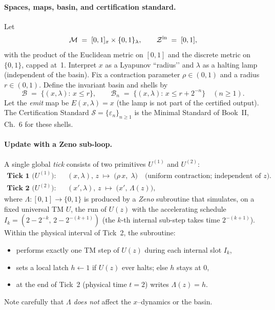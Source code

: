 \documentclass[12pt]{article}
\theoremstyle{definition}
\theoremstyle{plain}
\begin{document}
\paragraph{Spaces, maps, basin, and certification standard.}
Let
\[
\mathcal M \;=\; [0,1]_x \times \{0,1\}_\lambda,
\qquad
\mathcal Z^{\rm in} \;=\; [0,1],
\]
with the product of the Euclidean metric on $[0,1]$ and the discrete metric on $\{0,1\}$, capped at~1.
Interpret $x$ as a Lyapunov “radius’’ and $\lambda$ as a halting lamp (independent of the basin).
Fix a contraction parameter $\rho\in(0,1)$ and a radius $r\in(0,1)$.
Define the invariant basin and shells by
\[
\mathcal B \;=\; \{(x,\lambda):\, x\le r\}, 
\qquad
\mathcal B_n \;=\; \{(x,\lambda):\, x\le r + 2^{-n}\}\quad(n\ge1).
\]
Let the \emph{emit} map be $E(x,\lambda)=x$ (the lamp is not part of the certified output).
The Certification Standard $\mathcal S=\{\varepsilon_n\}_{n\ge1}$ is the Minimal Standard of Book~II, Ch.~6 for these shells.

\paragraph{Update with a Zeno sub-loop.}
A single global \emph{tick} consists of two primitives $U^{(1)}$ and $U^{(2)}$:
\begin{align*}
\textbf{Tick 1 ($U^{(1)}$):}\quad 
&(x,\lambda),\,z \;\mapsto\; \bigl(\rho\,x,\;\lambda\bigr)
\quad\text{(uniform contraction; independent of $z$).}\\[0.25em]
\textbf{Tick 2 ($U^{(2)}$):}\quad 
&(x',\lambda),\,z \;\mapsto\; \bigl(x',\,\Lambda(z)\bigr),
\end{align*}
where $\Lambda:[0,1]\to\{0,1\}$ is produced by a \emph{Zeno} subroutine that simulates, on a fixed universal TM \(U\), the run of \(U(z)\) with the accelerating schedule
$I_k=(2-2^{-k},\,2-2^{-(k+1)})$ (the $k$-th internal sub-step takes time $2^{-(k+1)}$).  
Within the physical interval of Tick~2, the subroutine:
\begin{itemize}
  \item performs exactly one TM step of \(U(z)\) during each internal slot $I_k$,
  \item sets a local latch $h\gets1$ if \(U(z)\) ever halts; else $h$ stays at $0$,
  \item at the end of Tick~2 (physical time $t=2$) writes $\Lambda(z)=h$.
\end{itemize}
Note carefully that $\Lambda$ \emph{does not} affect the $x$–dynamics or the basin.
\end{document}

